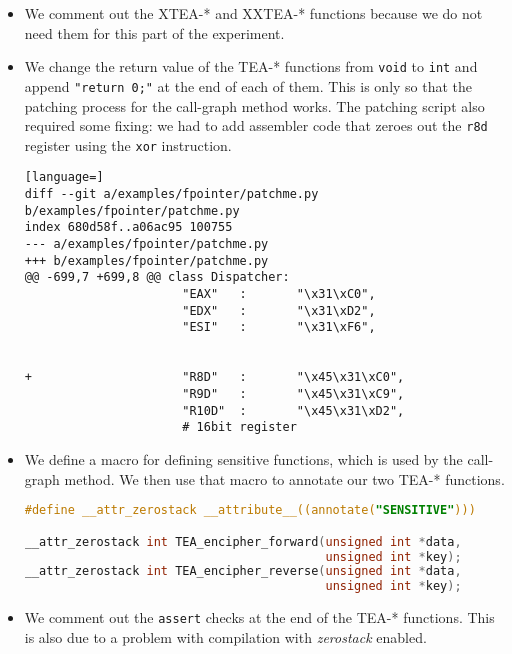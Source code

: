 \documentclass[a4paper,10pt,openright]{memoir}
\newcommand{\term}[1]{\textit{#1}}
\newcommand{\code}[1]{\texttt{#1}}
\begin{document}
\begin{itemize}

\item We comment out the XTEA-* and XXTEA-* functions because we do not 
need them for this part of the experiment.

\item We change the return value of the TEA-* functions from 
\code{void} to \code{int} and append \code{"return 0;"} at the end of 
each of them. This is only so that the patching process for the 
call-graph method works. The patching script also required some fixing: 
we had to add assembler code that zeroes out the \code{r8d} register 
using the \code{xor} instruction.

\begin{lstlisting}[language=]
diff --git a/examples/fpointer/patchme.py b/examples/fpointer/patchme.py
index 680d58f..a06ac95 100755
--- a/examples/fpointer/patchme.py
+++ b/examples/fpointer/patchme.py
@@ -699,7 +699,8 @@ class Dispatcher:
                      "EAX"   :       "\x31\xC0",
                      "EDX"   :       "\x31\xD2",
                      "ESI"   :       "\x31\xF6",
                      

+                     "R8D"   :       "\x45\x31\xC0", 
                      "R9D"   :       "\x45\x31\xC9",
                      "R10D"  :       "\x45\x31\xD2",
                      # 16bit register		
\end{lstlisting}

\item We define a macro for defining sensitive functions, which is used 
by the call-graph method. We then use that macro to annotate our two 
TEA-* functions.

\begin{lstlisting}[language=C]
#define __attr_zerostack __attribute__((annotate("SENSITIVE")))

__attr_zerostack int TEA_encipher_forward(unsigned int *data,
                                          unsigned int *key);
__attr_zerostack int TEA_encipher_reverse(unsigned int *data,
                                          unsigned int *key);
\end{lstlisting}

\item We comment out the \code{assert} checks at the end of the TEA-* 
functions. This is also due to a problem with compilation with 
\term{zerostack} enabled.

\end{itemize}
\end{document}
